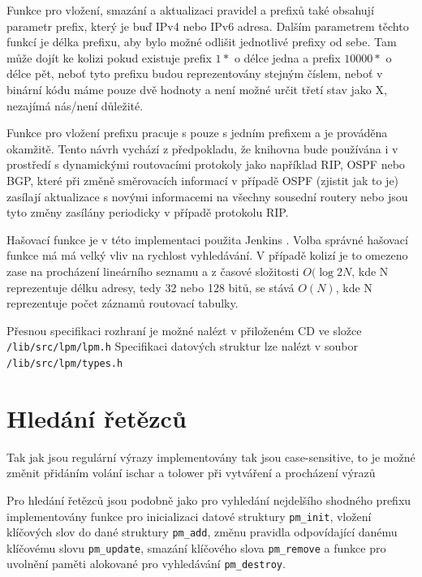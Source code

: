 Funkce pro vložení, smazání a aktualizaci pravidel a prefixů také obsahují parametr
prefix, který je buď IPv4 nebo IPv6 adresa. Dalším parametrem těchto funkcí je délka prefixu,
aby bylo možné odlišit jednotlivé prefixy od sebe. Tam může dojít ke kolizi pokud existuje
prefix $1*$ o délce jedna a prefix $10000*$ o délce pět, neboť tyto prefixu budou reprezentovány stejným
číslem, neboť v binární kódu máme pouze dvě hodnoty a není možné určit třetí stav jako X,
nezajímá nás/není důležité.

Funkce pro vložení prefixu pracuje s pouze s jedním prefixem a je prováděna okamžitě.
Tento návrh vychází z předpokladu, že knihovna bude používána i v prostředí s dynamickými routovacími
protokoly jako například RIP, OSPF nebo BGP, které při změně směrovacích informací v případě OSPF (zjistit jak to je)
zasílají aktualizace s novými informacemi na všechny sousední routery nebo jsou tyto změny zasílány periodicky
v případě protokolu RIP.

Hašovací funkce je v této implementaci použita Jenkins \cite{jenkins}. Volba správné hašovací funkce
má má velký vliv na rychlost vyhledávání. V případě kolizí je to omezeno zase na procházení lineárního
seznamu a z časové složitosti $O(\log{2}{N}$, kde N reprezentuje délku adresy, tedy 32 nebo 128 bitů,
se stává $O(N)$, kde N reprezentuje počet záznamů routovací tabulky.

Přesnou specifikaci rozhraní je možné nalézt v přiloženém CD ve složce \texttt{/lib/src/lpm/lpm.h}
Specifikaci datových struktur lze nalézt v soubor \texttt{/lib/src/lpm/types.h}


\section{Hledání řetězců} %

Tak jak jsou regulární výrazy implementovány tak jsou case-sensitive, to je možné změnit
přidáním volání ischar a tolower při vytváření a procházení výrazů

Pro hledání řetězců jsou podobně jako pro vyhledání nejdelšího shodného prefixu implementovány
funkce pro inicializaci datové struktury \texttt{pm\_init}, vložení klíčových slov do
dané struktury \texttt{pm\_add}, změnu pravidla odpovídající danému klíčovému slovu
\texttt{pm\_update}, smazání klíčového slova \texttt{pm\_remove} a funkce pro uvolnění
paměti alokované pro vyhledávání \texttt{pm\_destroy}.

